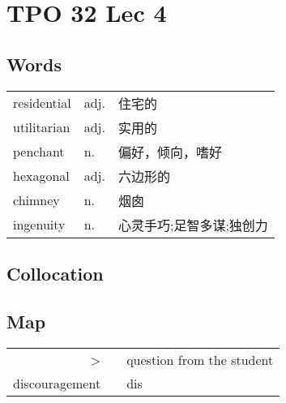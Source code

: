\section{TPO 32 Lec 4}

\subsection{Words}

\begin{tabular}{lll}
    residential & adj. & 住宅的           \\
    utilitarian & adj. & 实用的           \\
    penchant    & n.   & 偏好，倾向，嗜好      \\
    hexagonal   & adj. & 六边形的          \\
    chimney     & n.   & 烟囱            \\
    ingenuity   & n.   & 心灵手巧;足智多谋;独创力 \\
\end{tabular}

\subsection{Collocation}

\subsection{Map}

\begin{tabular}{rc@{\quad$\to$\quad}l}
    >              &  & question from the student \\
    discouragement &  & dis                       \\
\end{tabular}


